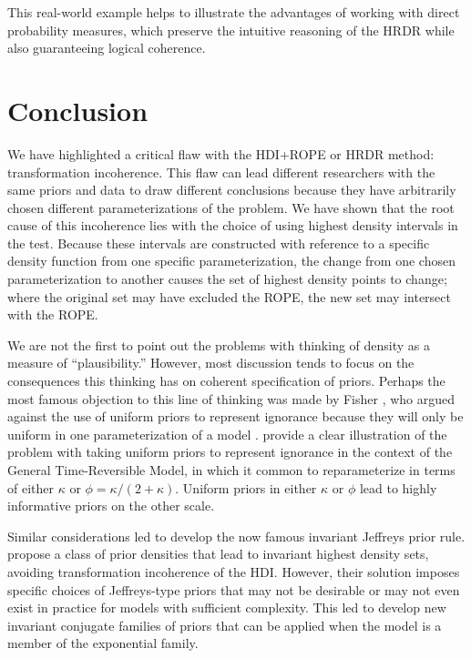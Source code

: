 \documentclass[9pt,twocolumn,twoside]{cidlab-draft}\templatetype{cidlab-invited}
\newcommand{\hdr}{HRDR}
\begin{document}
This real-world example helps to illustrate the advantages of working with direct probability measures, which preserve the intuitive reasoning of the \hdr{} while also guaranteeing logical coherence.

\section*{Conclusion}
We have highlighted a critical flaw with the HDI+ROPE or \hdr{} method: transformation incoherence. This flaw can lead different researchers with the same priors and data to draw different conclusions because they have arbitrarily chosen different parameterizations of the problem. We have shown that the root cause of this incoherence lies with the choice of using highest density intervals in the test. Because these intervals are constructed with reference to a specific density function from one specific parameterization, the change from one chosen parameterization to another causes  the set of highest density points to change; where the original set may have excluded the ROPE, the new set may intersect with the ROPE. 

We are not the first to point out the problems with thinking of density as a measure of ``plausibility.'' However, most discussion tends to focus on the consequences this thinking has on coherent specification of priors. Perhaps the most famous objection to this line of thinking was made by Fisher \cite{lehmann2011fisher}, who argued against the use of uniform priors to represent ignorance because they will only be uniform in one parameterization of a model \cite<for a thorough demonstration see>{ly2017tutorial}.  provide a clear illustration of the problem with taking uniform priors to represent ignorance in the context of the General Time-Reversible Model, in which it common to reparameterize in terms of either $\kappa$ or $\phi = \kappa/(2+\kappa)$. Uniform priors in either $\kappa$ or $\phi$ lead to highly informative priors on the other scale. 

Similar considerations led  to develop the now famous invariant Jeffreys prior rule.  propose a class of prior densities that lead to invariant highest density sets, avoiding transformation incoherence of the HDI. However, their solution imposes specific choices of Jeffreys-type priors that may not be desirable or may not even exist in practice for models with sufficient complexity. This led  to develop new invariant conjugate families of priors that can be applied when the model is a member of the exponential family. 
\end{document}
